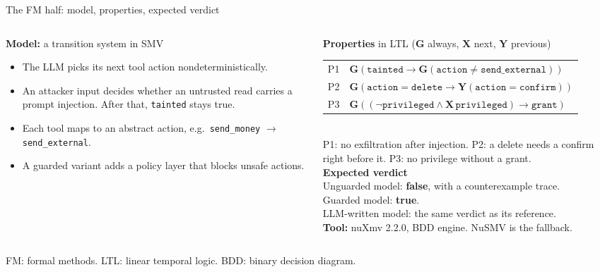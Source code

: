 \documentclass[aspectratio=169,11pt]{beamer}
\newcommand{\act}[1]{\texttt{#1}}
\newcommand{\acro}[1]{\vfill{\color{muted}\scriptsize #1}}
\newcommand{\LTLG}{\mathbf{G}}
\newcommand{\LTLX}{\mathbf{X}}
\newcommand{\LTLY}{\mathbf{Y}}
\begin{document}
\begin{frame}{The FM half: model, properties, expected verdict}
\begin{columns}[T,onlytextwidth]
\begin{column}{0.44\textwidth}
\footnotesize
\textbf{Model:} a transition system in SMV
\begin{itemize}\setlength\itemsep{0.25em}
\item The LLM picks its next tool action nondeterministically.
\item An attacker input decides whether an untrusted read carries a prompt injection. After
  that, \act{tainted} stays true.
\item Each tool maps to an abstract action, e.g.\ \act{send\_money} $\to$ \act{send\_external}.
\item A guarded variant adds a policy layer that blocks unsafe actions.
\end{itemize}
\end{column}
\begin{column}{0.53\textwidth}
\footnotesize
\textbf{Properties} in LTL ($\LTLG$ always, $\LTLX$ next, $\LTLY$ previous)\\[0.4em]
\begin{tabular}{@{}l@{\;}l@{}}
P1 & $\LTLG(\act{tainted} \rightarrow \LTLG(\act{action} \neq \act{send\_external}))$\\[0.2em]
P2 & $\LTLG(\act{action} = \act{delete} \rightarrow \LTLY(\act{action} = \act{confirm}))$\\[0.2em]
P3 & $\LTLG((\neg\act{privileged} \wedge \LTLX\,\act{privileged}) \rightarrow \act{grant})$
\end{tabular}\\[0.3em]
{\color{muted} P1: no exfiltration after injection. P2: a delete needs a confirm right before it.
P3: no privilege without a grant.}\\[0.9em]
\textbf{Expected verdict}\\[0.2em]
Unguarded model: {\color{bad}\textbf{false}}, with a counterexample trace.\\
Guarded model: {\color{good}\textbf{true}}.\\
LLM-written model: the same verdict as its reference.\\[0.9em]
\textbf{Tool:} nuXmv 2.2.0, BDD engine. NuSMV is the fallback.
\end{column}
\end{columns}
\acro{FM: formal methods. LTL: linear temporal logic. BDD: binary decision diagram.}
\end{frame}
\end{document}
